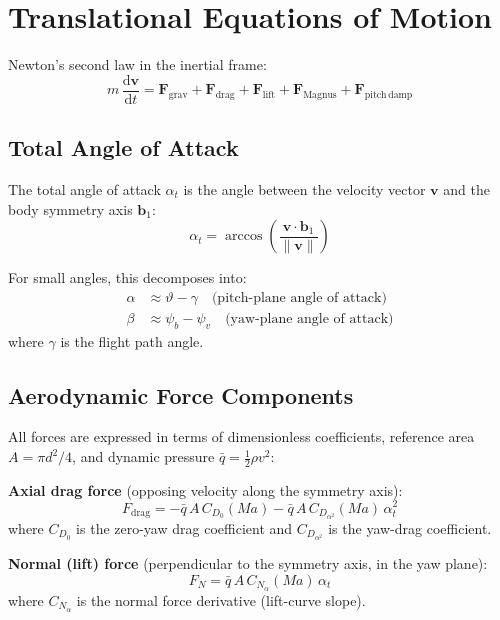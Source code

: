 \documentclass[11pt,twoside,openright]{report}
\newcommand{\dd}{\mathrm{d}}
\newcommand{\vvec}{\bm{v}}
\newcommand{\Mach}{\mathit{Ma}}
\begin{document}
\section{Translational Equations of Motion}

Newton's second law in the inertial frame:
\begin{equation}
  \boxed{m\,\frac{\dd \vvec}{\dd t} = \bm{F}_{\mathrm{grav}} + \bm{F}_{\mathrm{drag}} + \bm{F}_{\mathrm{lift}} + \bm{F}_{\mathrm{Magnus}} + \bm{F}_{\mathrm{pitch\,damp}}}
  \label{eq:6dof_trans}
\end{equation}

\subsection{Total Angle of Attack}

The total angle of attack $\alpha_t$ is the angle between the velocity vector $\vvec$ and the body symmetry axis $\bm{b}_1$:
\begin{equation}
  \alpha_t = \arccos\left(\frac{\vvec \cdot \bm{b}_1}{\|\vvec\|}\right)
  \label{eq:total_aoa}
\end{equation}

For small angles, this decomposes into:
\begin{align}
  \alpha &\approx \vartheta - \gamma \quad \text{(pitch-plane angle of attack)} \\
  \beta  &\approx \psi_b - \psi_v \quad \text{(yaw-plane angle of attack)}
\end{align}
where $\gamma$ is the flight path angle.

\subsection{Aerodynamic Force Components}

All forces are expressed in terms of dimensionless coefficients, reference area $A = \pi d^2/4$, and dynamic pressure $\bar{q} = \frac{1}{2}\rho v^2$:

\textbf{Axial drag force} (opposing velocity along the symmetry axis):
\begin{equation}
  F_{\mathrm{drag}} = -\bar{q}\,A\,C_{D_0}(\Mach) - \bar{q}\,A\,C_{D_{\alpha^2}}(\Mach)\,\alpha_t^2
  \label{eq:6dof_drag}
\end{equation}
where $C_{D_0}$ is the zero-yaw drag coefficient and $C_{D_{\alpha^2}}$ is the yaw-drag coefficient.

\textbf{Normal (lift) force} (perpendicular to the symmetry axis, in the yaw plane):
\begin{equation}
  F_N = \bar{q}\,A\,C_{N_\alpha}(\Mach)\,\alpha_t
  \label{eq:6dof_lift}
\end{equation}
where $C_{N_\alpha}$ is the normal force derivative (lift-curve slope).
\end{document}
